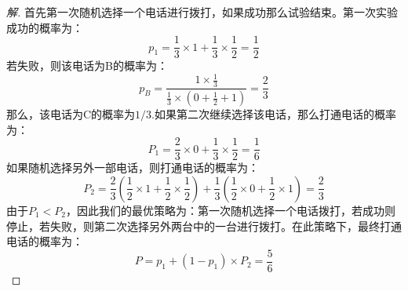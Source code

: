 \documentclass[12pt]{article}
\begin{document}
\begin{enumerate}
\begin{proof}[解]
	首先第一次随机选择一个电话进行拨打，如果成功那么试验结束。第一次实验成功的概率为：
	\begin{equation}
	p_1=\frac{1}{3}\times 1+\frac{1}{3}\times\frac{1}{2}=\frac{1}{2}
	\end{equation}
	若失败，则该电话为B的概率为：
	\begin{equation}
	p_B=\frac{1\times\frac{1}{3}}{\frac{1}{3}\times(0+\frac{1}{2}+1)}=\frac{2}{3}
	\end{equation}
	那么，该电话为C的概率为$1/3$.如果第二次继续选择该电话，那么打通电话的概率为：
	\begin{equation}
	P_1=\frac{2}{3}\times 0+\frac{1}{3}\times \frac{1}{2}=\frac{1}{6}
	\end{equation}
	如果随机选择另外一部电话，则打通电话的概率为：
	\begin{equation}
	P_2=\frac{2}{3}\left(\frac{1}{2}\times 1+\frac{1}{2}\times \frac{1}{2}\right)+\frac{1}{3}\left(\frac{1}{2}\times 0+\frac{1}{2}\times 1\right)=\frac{2}{3}
	\end{equation}
	由于$P_1<P_2$，因此我们的最优策略为：第一次随机选择一个电话拨打，若成功则停止，若失败，则第二次选择另外两台中的一台进行拨打。在此策略下，最终打通电话的概率为：
	\begin{equation}
	P=p_1+(1-p_1)\times P_2=\frac{5}{6}
	\end{equation}
\end{proof}
\end{enumerate}
\end{document}
